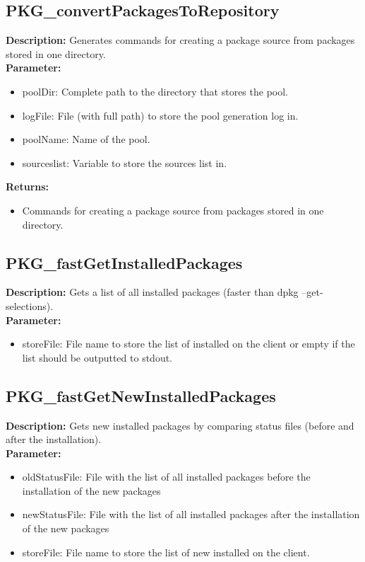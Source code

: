 \subsection{PKG\_convertPackagesToRepository}
\textbf{Description:} Generates commands for creating a package source from packages stored in one directory.\\
\textbf{Parameter:}
\begin{itemize}
\item poolDir: Complete path to the directory that stores the pool.
\item logFile: File (with full path) to store the pool generation log in.
\item poolName: Name of the pool.
\item sourceslist: Variable to store the sources list in.
\end{itemize}
\textbf{Returns:}
\begin{itemize}
\item Commands for creating a package source from packages stored in one directory.
\end{itemize}

\subsection{PKG\_fastGetInstalledPackages}
\textbf{Description:} Gets a list of all installed packages (faster than dpkg --get-selections).\\
\textbf{Parameter:}
\begin{itemize}
\item storeFile: File name to store the list of installed on the client or empty if the list should be outputted to stdout.
\end{itemize}

\subsection{PKG\_fastGetNewInstalledPackages}
\textbf{Description:} Gets new installed packages by comparing status files (before and after the installation).\\
\textbf{Parameter:}
\begin{itemize}
\item oldStatusFile: File with the list of all installed packages before the installation of the new packages
\item newStatusFile: File with the list of all installed packages after the installation of the new packages
\item storeFile: File name to store the list of new installed on the client.
\end{itemize}

